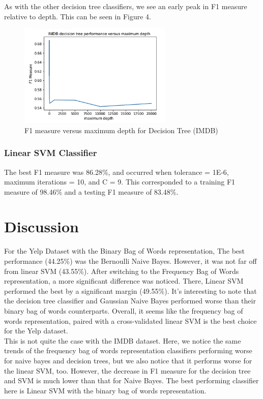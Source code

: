 \documentclass[11pt]{article}
\begin{document}
\noindent
As with the other decision tree classifiers, we see an early peak in F1 measure relative to depth. This can be seen in Figure 4.

\begin{figure}[ht]
\centering
\includegraphics[width=0.65\textwidth]{IMDB_DT}
\caption{F1 measure versus maximum depth for Decision Tree (IMDB)}
\end{figure}

\subsubsection{Linear SVM Classifier}
The best F1 measure was 86.28\%, and occurred when tolerance = 1E-6, maximum iterations = 10, and C = 9. This corresponded to a training F1 measure of 98.46\% and a testing F1 measure of 83.48\%.

\section{Discussion}
For the Yelp Dataset with the Binary Bag of Words representation, The best performance (44.25\%) was the Bernoulli Naive Bayes. However, it was not far off from linear SVM (43.55\%). After switching to the Frequency Bag of Words representation, a more significant difference was noticed. There, Linear SVM performed the best by a significant margin (49.55\%). It's interesting to note that the decision tree classifier and Gaussian Naive Bayes performed worse than their binary bag of words counterparts. Overall, it seems like the frequency bag of words representation, paired with a cross-validated linear SVM is the best choice for the Yelp dataset.\\

This is not quite the case with the IMDB dataset. Here, we notice the same trends of the frequency bag of words representation classifiers performing worse for naive bayes and decision trees, but we also notice that it performs worse for the linear SVM, too. However, the decrease in F1 measure for the decision tree and SVM is much lower than that for Naive Bayes. The best performing classifier here is Linear SVM with the binary bag of words representation.\\
\end{document}
